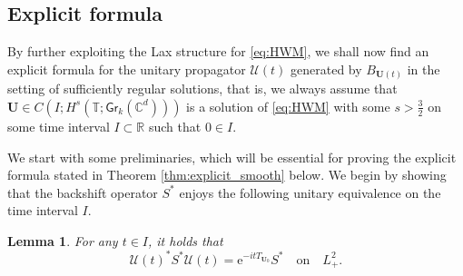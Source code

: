 \documentclass[10pt,reqno,a4paper]{amsart}
\newtheorem{lem}{Lemma}[section]
\theoremstyle{definition}
\theoremstyle{remark}
\theoremstyle{remark}
\numberwithin{equation}{section}
\newcommand{\C}{\mathbb{C}}
\newcommand{\R}{\mathbb{R}}
\newcommand{\T}{\mathbb{T}}
\newcommand{\eu}{\mathrm{e}}
\newcommand{\Ub}{\mathbf{U}}
\newcommand{\Gr}{\mathsf{Gr}}
\newcommand{\Us}{\mathscr{U}}
\begin{document}
\subsection{Explicit formula}

By further exploiting the Lax structure for \eqref{eq:HWM}, we shall now find an explicit formula for the unitary propagator $\Us(t)$ generated by $B_{\Ub(t)}$ in the setting of sufficiently regular solutions, that is, we always assume that $\Ub \in C(I; H^s(\T; \Gr_k(\C^d)))$ is a solution of \eqref{eq:HWM} with some $s > \frac{3}{2}$ on some  time interval $I \subset \R$ such that $0 \in I$. 

We start with some preliminaries, which will be essential for proving the explicit formula stated in Theorem \ref{thm:explicit_smooth} below. We begin by showing that the backshift operator $S^*$ enjoys the following unitary equivalence on the time interval $I$.

\begin{lem} \label{lem:S_star_unitary}
For any $t \in I$, it holds that
$$
\Us(t)^* S^* \Us(t) =  \eu^{-it T_{\Ub_0}} S^* \quad \mbox{on} \quad L^2_+.
$$
\end{lem}
\end{document}
